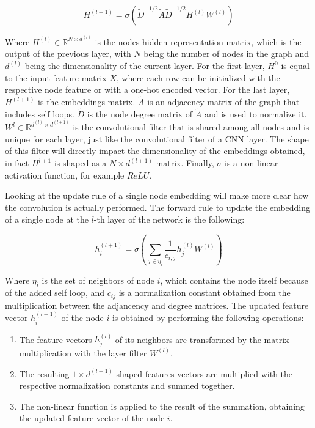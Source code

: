 \documentclass[%
    corpo=13.5pt,
    twoside,
    oldstyle,
    tipotesi=magistrale,
    greek,
    evenboxes
]{toptesi}
\begin{document}
\begin{equation} \label{gcn1}
H^{(l+1)}=\sigma(\tilde{D}^{-1/2}\tilde{A}\tilde{D}^{-1/2}H^{(l)}W^{(l)})
\end{equation}

Where $H^{(l)} \in\mathbb{R}^{N \times d^{(l)}}$ is the nodes hidden
representation matrix, which is the output of the previous layer, with $N$ being
the number of nodes in the graph and $d^{(l)}$ being the dimensionality of
the current layer. For the first
layer, $H^{0}$ is equal to the input feature matrix $X$, where each row can be
initialized with the respective node feature or with a one-hot encoded vector.
For the last layer, $H^{(l+1)}$ is the embeddings matrix.
$\tilde{A}$ is an adjacency matrix of the graph that includes self loops.
$\tilde{D}$ is the node degree matrix of $\tilde{A}$ and is used to
normalize it.
$W^{l}\in\mathbb{R}^{d^{(l)} \times d^{(l+1)}}$ is the convolutional filter that
is shared among all nodes and is unique for each layer, just like the
convolutional filter of a CNN layer.
The shape of this filter will directly impact the dimensionality of the
embeddings obtained, in fact $H^{l+1}$ is shaped as a $N\times d^{(l+1)}$ matrix.
Finally, $\sigma$ is a non linear activation function, for example $ReLU$.

Looking at the update rule of a single node embedding will make more clear how
the convolution is actually performed.
The forward rule to update the embedding of a single node at the $l$-th layer
of the network is the following:

\begin{equation} \label{gcn2}
    h^{(l+1)}_{i}=\sigma(\sum_{j\in\eta_{i}} \frac{1}{c_{i,j}}h_j^{(l)}W^{{(l)}})
\end{equation}

Where $\eta_i$ is the set of neighbors of node $i$, which contains the node
itself because of the added self loop, and $c_{ij}$ is a
normalization constant obtained from the multiplication between the adjancency
and degree matrices.
The updated feature vector $h^{(l+1)}_{i}$ of the node $i$ is
obtained by performing the following operations:

\begin{enumerate}
    \item The feature vectors $h_j^{(l)}$ of its neighbors are transformed by
        the matrix multiplication with the layer filter $W^{(l)}$.
    \item The resulting $1 \times d^{(l+1)}$ shaped features vectors
        are multiplied with the respective normalization constants and summed
        together.
    \item The non-linear function is applied to the result of the summation,
        obtaining the updated feature vector of the node $i$.
\end{enumerate}
\end{document}
